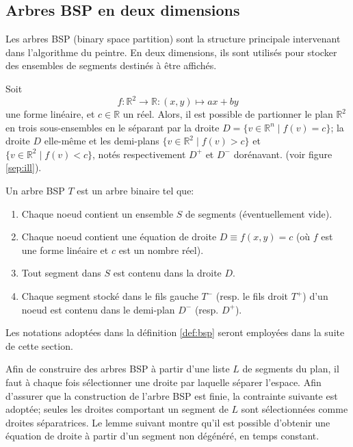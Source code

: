 \subsection{Arbres BSP en deux dimensions}
Les arbres BSP (binary space partition) sont la structure principale
intervenant dans l'algorithme du peintre. En deux dimensions, ils sont
utilisés pour stocker des ensembles de segments destinés à être affichés.


Soit
\begin{equation} \label{lin:forme}
f: \mathbb R^2 \to \mathbb R: (x, y)\mapsto ax +by
\end{equation}
une forme linéaire, et $c\in\mathbb R$ un réel. Alors, il est possible de
partionner le plan $\mathbb R^2$ en trois sous-ensembles en le séparant
par la droite $D = \{v\in\mathbb R^n\mid f(v) = c\}$;
la droite $D$ elle-même et les demi-plans
$\{v\in\mathbb R^2\mid f(v) > c\}$ et
$\{v\in\mathbb R^2\mid f(v) < c\}$, notés respectivement $D^+$ et $D^-$
dorénavant.
(voir figure \ref{sep:ill}).




\begin{df}\label{def:bsp}
  Un arbre BSP $T$ est un arbre binaire tel que:
  \begin{enumerate}
  \item Chaque noeud contient un ensemble $S$ de segments (éventuellement
    vide).
  \item Chaque noeud contient une équation de droite $D\equiv f(x, y) = c$
    (où $f$ est une forme linéaire et $c$ est un nombre réel).
  \item Tout segment dans $S$ est contenu dans la droite $D$.
  \item Chaque segment stocké dans le fils gauche $T^-$ (resp.
    le fils droit $T^+$) d'un noeud est contenu dans le demi-plan
    $D^-$ (resp. $D^+$).
  \end{enumerate}
\end{df}
Les notations adoptées dans la définition \ref{def:bsp} seront employées
dans la suite de cette section.

Afin de construire des arbres BSP à partir d'une liste $L$ de segments
du plan, il faut à chaque fois sélectionner une droite par laquelle
séparer l'espace. Afin d'assurer que la construction de l'arbre BSP
est finie, la contrainte suivante est adoptée;
seules les droites comportant un segment de $L$ sont sélectionnées comme
droites séparatrices.
Le lemme suivant montre qu'il est possible d'obtenir une équation de droite
à partir d'un segment non dégénéré, en temps constant.

